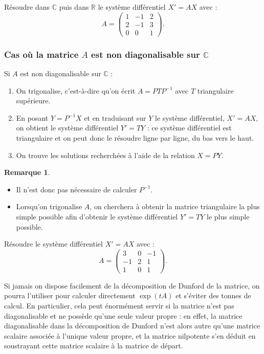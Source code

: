 \documentclass[french]{article}
\newcommand{\R}{\mathbb{R}}
\newcommand{\C}{\mathbb{C}}
\newcommand{\inv}{^{-1}}
\theoremstyle{plain}
\theoremstyle{definition}
\newtheorem*{rmq}{Remarque}
\theoremstyle{remark}
\begin{document}
\begin{exo}
	Résoudre dans $\C$ puis dans $\R$ le système différentiel $X'=AX$ avec :
	$$A=\begin{pmatrix}
		1&-1&2\\
		2&-1&3\\
		0&0&1
	\end{pmatrix}.$$
\end{exo}

\subsubsection*{Cas où la matrice $A$ est non diagonalisable sur $\C$}

\begin{met}
	Si $A$ est non diagonalisable sur $\C$ :
	\begin{enumerate}
		\item On trigonalise, c'est-à-dire qu'on écrit $A=PTP\inv$ avec $T$ triangulaire supérieure.
		\item En posant $Y=P\inv X$ et en traduisant sur $Y$ le système différentiel, $X'=AX$, on obtient le système différentiel $Y'=TY$ : ce système différentiel est triangulaire et on peut donc le résoudre ligne par ligne, du bas vers le haut.
		\item On trouve les solutions recherchées à l'aide de la relation $X=PY$.
	\end{enumerate}
\end{met}

\begin{rmq}
	\begin{itemize}
		\item Il n'est donc pas nécessaire de calculer $P\inv$.
		\item Lorsqu'on trigonalise $A$, on cherchera à obtenir la matrice triangulaire la plus simple possible afin d'obtenir le système différentiel $Y'=TY$ le plus simple possible.
	\end{itemize}
\end{rmq}

\begin{exo}
	Résoudre le système différentiel $X'=AX$ avec :
	$$A=\begin{pmatrix}
		3&0&-1\\
		-1&2&1\\
		1&0&1
	\end{pmatrix}.$$
\end{exo}

\begin{met}
	Si jamais on dispose facilement de la décomposition de Dunford de la matrice, on pourra l'utiliser pour calculer directement $\exp(tA)$ et s'éviter des tonnes de calcul. En particulier, cela peut énormément servir si la matrice n'est pas diagonalisable et ne possède qu'une seule valeur propre : en effet, la matrice diagonalisable dans la décomposition de Dunford n'est alors autre qu'une matrice scalaire associée à l'unique valeur propre, et la matrice nilpotente s'en déduit en soustrayant cette matrice scalaire à la matrice de départ.
\end{met}
\end{document}
